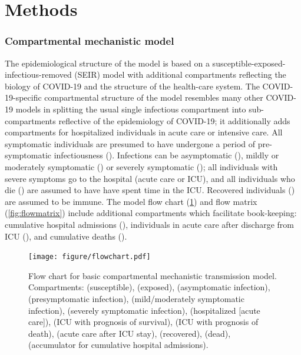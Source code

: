 \documentclass[12pt]{article}\usepackage[]{graphicx}\usepackage[]{color}
\begin{document}
\section{Methods}

\subsubsection*{Compartmental mechanistic model}

The epidemiological structure of the model is based on
a susceptible-exposed-infectious-removed (SEIR) model with
additional compartments reflecting the biology of COVID-19 and the
structure of the health-care system. The COVID-19-specific compartmental structure
of the model resembles many other COVID-19 models
in splitting the usual single infectious compartment into sub-compartments reflective
of the epidemiology of COVID-19; it additionally adds
compartments for hospitalized individuals in acute care
or intensive care. All symptomatic individuals are
presumed to have undergone a period of pre-symptomatic infectiousness
(). Infections can be
asymptomatic (), mildly or moderately symptomatic () or
severely symptomatic (); all individuals with severe symptoms
go to the hospital (acute care or ICU), and all individuals who die () are assumed to have
have spent time in the ICU.  Recovered individuals () are
assumed to be immune.  The model flow chart
(\cref{fig:flowchart}) and flow matrix (\cref{fig:flowmatrix})
include additional compartments which facilitate book-keeping:
cumulative hospital admissions (), individuals in acute care
after discharge from ICU (), and cumulative deaths
().

\begin{figure}
\color{fgcolor}
\texttt{[image: figure/flowchart.pdf]}
\caption{Flow chart for basic compartmental mechanistic transmission
  model. Compartments:  (susceptible),  (exposed),
   (asymptomatic infection),  (presymptomatic
  infection),  (mild/moderately symptomatic infection),
   (severely symptomatic infection),  (hospitalized
  [acute care]),  (ICU with prognosis of survival),
   (ICU with prognosis of death),  (acute care
  after ICU stay),  (recovered),  (dead), 
  (accumulator for cumulative hospital admissions).
  }
\label{fig:flowchart}
\end{figure}
\end{document}
